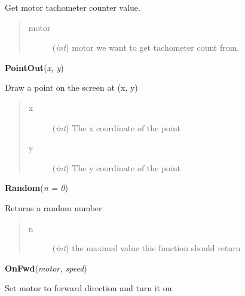 \documentclass[10pt,a4paper]{article}
\begin{document}
    Get motor tachometer counter value.





\begin{quote}
    \begin{description}
        
\item[motor] ({\emph{int}}) motor we want to get tachometer count from.

    \end{description}
\end{quote}

 

\vspace{6pt}
{\bf PointOut}({\it x, y}) 
    
    Draw a point on the screen at (x, y)



    


\begin{quote}
    \begin{description}
        
\item[x] ({\emph{int}}) The x coordinate of the point

\item[y] ({\emph{int}}) The y coordinate of the point

    \end{description}
\end{quote}

 

\vspace{6pt}
{\bf Random}({\it n = 0}) 
    
    Returns a random number





\begin{quote}
    \begin{description}
        
\item[n] ({\emph{int}}) the maximal value this function should return

    \end{description}
\end{quote}

 

\vspace{6pt}
{\bf OnFwd}({\it motor, speed}) 
  
    Set motor to forward direction and turn it on.
    
\end{document}
